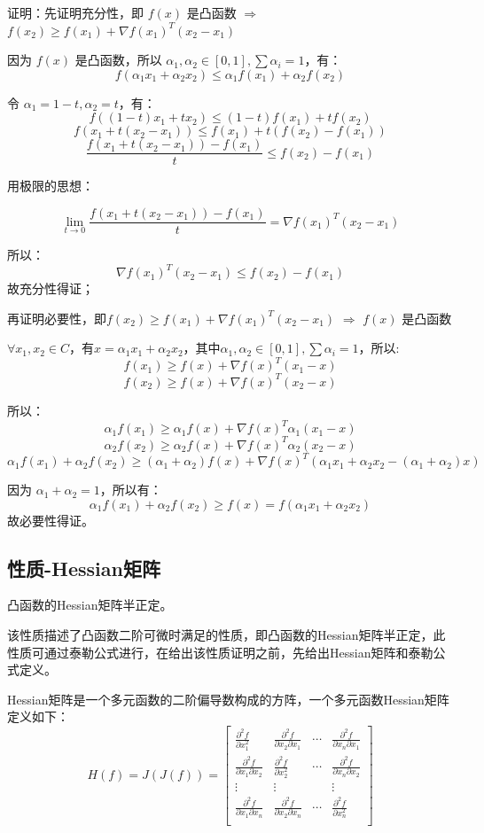 \documentclass[12pt]{article}
\begin{document}
\begin{framed}  
\small{
证明：先证明充分性，即 $f(x)$ 是凸函数 $\Rightarrow$ $f(x_2) \ge f(x_1) + \nabla f(x_1)^T(x_2-x_1)$

因为 $f(x)$ 是凸函数，所以 $\alpha_1, \alpha_2 \in [0,1], \sum\alpha_i = 1$，有：
$$
f(\alpha_1x_1 + \alpha_2x_2) \le \alpha_1f(x_1) + \alpha_2f(x_2)
$$

令 $\alpha_1 = 1 - t, \alpha_2 = t$，有：
$$
f((1-t)x_1 + tx_2) \le (1-t)f(x_1) + tf(x_2)
$$
$$
f(x_1 + t(x_2-x_1)) \le f(x_1) + t(f(x_2) - f(x_1))
$$
$$
\frac{f(x_1 + t(x_2-x_1)) - f(x_1)}{t} \le f(x_2) - f(x_1)
$$

用极限的思想：

$$\lim_{t \to 0}\frac{f(x_1 + t(x_2-x_1)) - f(x_1)}{t} = \nabla f(x_1)^T(x_2 - x_1)$$

所以：
$$
\nabla f(x_1)^T(x_2 - x_1) \le f(x_2) - f(x_1)
$$
故充分性得证；

再证明必要性，即$f(x_2) \ge f(x_1) + \nabla f(x_1)^T(x_2-x_1)$ $\Rightarrow$  $f(x)$ 是凸函数

$\forall x_1, x_2 \in C$，有$x = \alpha_1x_1 + \alpha_2x_2$，其中$\alpha_1, \alpha_2 \in [0,1], \sum\alpha_i = 1$，所以:
$$
f(x_1) \ge f(x) + \nabla f(x)^T(x_1-x) 
$$
$$
f(x_2) \ge f(x) + \nabla f(x)^T(x_2-x) 
$$

所以：
$$
\alpha_1f(x_1) \ge \alpha_1f(x) + \nabla f(x)^T\alpha_1(x_1-x) 
$$
$$
\alpha_2f(x_2) \ge \alpha_2f(x) + \nabla f(x)^T\alpha_2(x_2-x) 
$$
$$
\alpha_1f(x_1) + \alpha_2f(x_2) \ge (\alpha_1+\alpha_2)f(x) + \nabla f(x)^T(\alpha_1x_1 + \alpha_2x_2 - (\alpha_1+\alpha_2)x)
$$

因为 $\alpha_1 + \alpha_2 = 1$，所以有：
$$
\alpha_1f(x_1) + \alpha_2f(x_2) \ge f(x) = f(\alpha_1x_1 + \alpha_2x_2)
$$
故必要性得证。
}
\end{framed}

\subsection{性质-Hessian矩阵}
凸函数的Hessian矩阵半正定。

该性质描述了凸函数二阶可微时满足的性质，即凸函数的Hessian矩阵半正定，此性质可通过泰勒公式进行，在给出该性质证明之前，先给出Hessian矩阵和泰勒公式定义。

Hessian矩阵是一个多元函数的二阶偏导数构成的方阵，一个多元函数Hessian矩阵定义如下：
$$
H(f) = J(J(f)) =
\begin{bmatrix}
\frac{\partial^2 f}{\partial x_1^2} & \frac{\partial^2 f}{\partial x_2\partial x_1} & \cdots & \frac{\partial^2 f}{\partial x_n\partial x_1}  \\
\frac{\partial^2 f}{\partial x_1\partial x_2} & \frac{\partial^2 f}{\partial x_2^2} & \cdots & \frac{\partial^2 f}{\partial x_n\partial x_2}  \\
\vdots & \vdots &  & \vdots \\
\frac{\partial^2 f}{\partial x_1\partial x_n} & \frac{\partial^2 f}{\partial x_2\partial x_n} & \cdots & \frac{\partial^2 f}{\partial x_n^2}  \\
\end{bmatrix}
$$
\end{document}
